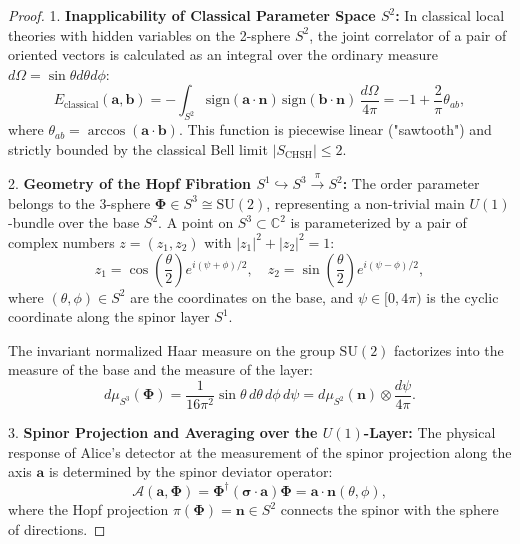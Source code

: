 \documentclass[12pt,a4paper]{article}
\begin{document}
	\begin{proof}
	1. \textbf{Inapplicability of Classical Parameter Space $S^2$:}
	In classical local theories with hidden variables on the 2-sphere $S^2$, the joint correlator of a pair of oriented vectors is calculated as an integral over the ordinary measure $d\Omega = \sin\theta d\theta d\phi$:
	\begin{equation}
	E_{\text{classical}}(\mathbf{a}, \mathbf{b}) = -\int_{S^2} \mathrm{sign}(\mathbf{a} \cdot \mathbf{n}) \, \mathrm{sign}(\mathbf{b} \cdot \mathbf{n}) \, \frac{d\Omega}{4\pi} = -1 + \frac{2}{\pi}\theta_{ab},
	\end{equation}
	where $\theta_{ab} = \arccos(\mathbf{a} \cdot \mathbf{b})$. This function is piecewise linear ("sawtooth") and strictly bounded by the classical Bell limit $|S_{\text{CHSH}}| \le 2$.
									
	2. \textbf{Geometry of the Hopf Fibration $S^1 \hookrightarrow S^3 \xrightarrow{\pi} S^2$:}
	The order parameter belongs to the 3-sphere $\boldsymbol{\Phi} \in S^3 \cong \mathrm{SU}(2)$, representing a non-trivial main $U(1)$-bundle over the base $S^2$. A point on $S^3 \subset \mathbb{C}^2$ is parameterized by a pair of complex numbers $z = (z_1, z_2)$ with $|z_1|^2 + |z_2|^2 = 1$:
	\begin{equation}
	z_1 = \cos\left(\frac{\theta}{2}\right) e^{i(\psi + \phi)/2}, \quad z_2 = \sin\left(\frac{\theta}{2}\right) e^{i(\psi - \phi)/2},
	\end{equation}
	where $(\theta, \phi) \in S^2$ are the coordinates on the base, and $\psi \in [0, 4\pi)$ is the cyclic coordinate along the spinor layer $S^1$.
												
	The invariant normalized Haar measure on the group $\mathrm{SU}(2)$ factorizes into the measure of the base and the measure of the layer:
	\begin{equation}
	d\mu_{S^3}(\boldsymbol{\Phi}) = \frac{1}{16\pi^2} \sin\theta \, d\theta \, d\phi \, d\psi = d\mu_{S^2}(\mathbf{n}) \otimes \frac{d\psi}{4\pi}.
	\end{equation}
												
	3. \textbf{Spinor Projection and Averaging over the $U(1)$-Layer:}
	The physical response of Alice's detector at the measurement of the spinor projection along the axis $\mathbf{a}$ is determined by the spinor deviator operator:
	\begin{equation}
	\mathcal{A}(\mathbf{a}, \boldsymbol{\Phi}) = \boldsymbol{\Phi}^\dagger (\boldsymbol{\sigma} \cdot \mathbf{a}) \boldsymbol{\Phi} = \mathbf{a} \cdot \mathbf{n}(\theta, \phi),
	\end{equation}
	where the Hopf projection $\pi(\boldsymbol{\Phi}) = \mathbf{n} \in S^2$ connects the spinor with the sphere of directions. 
										

\end{proof}
\end{document}
